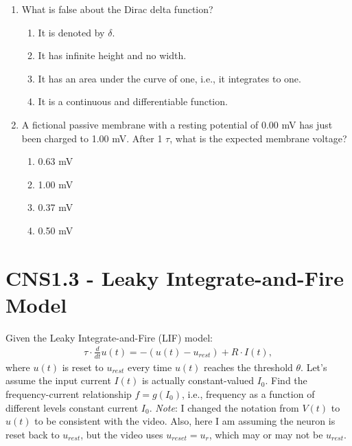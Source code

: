 \documentclass[11pt,letterpaper]{article}
\begin{document}
\begin{enumerate}
\begin{enumerate}
        \item What is false about the Dirac delta function?
        \begin{enumerate}
            \item It is denoted by \(\delta\).
            \item It has infinite height and no width.
            \item It has an area under the curve of one, i.e., it integrates to one.
            \item It is a continuous and differentiable function.
        \end{enumerate}
        \item A fictional passive membrane with a resting potential of 0.00 mV has just been charged to 1.00 mV. After 1 $\tau$, what is the expected membrane voltage?
        \begin{enumerate}
            \item 0.63 mV
            \item 1.00 mV
            \item 0.37 mV
            \item 0.50 mV
        \end{enumerate}
    \end{enumerate}
\end{enumerate}
\pagebreak

\section{CNS1.3 - Leaky Integrate-and-Fire Model}
Given the Leaky Integrate-and-Fire (LIF) model:
\begin{align*}
    \tau \cdot \frac{d}{dt} u(t) = - \left( u(t) - u_{rest}\right) + R \cdot I(t),
\end{align*}where $u(t)$ is reset to $u_{rest}$ every time $u(t)$ reaches the threshold $\theta$. Let's assume the input current $I(t)$ is actually constant-valued $I_0$. Find the frequency-current relationship $f = g(I_0)$, i.e., frequency as a function of different levels constant current $I_0$. \emph{Note}: I changed the notation from $V(t)$ to $u(t)$ to be consistent with the video. Also, here I am assuming the neuron is reset back to $u_{rest}$, but the video uses $u_{reset} = u_r$, which may or may not be $u_{rest}$.
\end{document}
